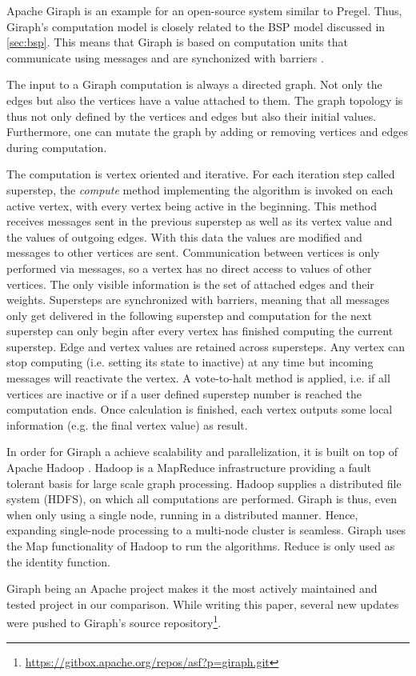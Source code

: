 Apache Giraph is an example for an open-source system similar to Pregel.
Thus, Giraph's computation model is closely related to the BSP model discussed in \autoref{sec:bsp}. 
This means that Giraph is based on computation units that communicate using messages and are synchonized with barriers \cite{Giraph}.

The input to a Giraph computation is always a directed graph. Not only the edges but also the vertices have a value attached to them. The graph topology is thus not only defined by the vertices and edges but also their initial values.
Furthermore, one can mutate the graph by adding or removing vertices and edges during computation.

The computation is vertex oriented and iterative.
For each iteration step called superstep, the \emph{compute} method implementing the algorithm is invoked on each active vertex, with every vertex being active in the beginning.
This method receives messages sent in the previous superstep as well as its vertex value and the values of outgoing edges.
With this data the values are modified and messages to other vertices are sent.
Communication between vertices is only performed via messages, so a vertex has no direct access to values of other vertices. The only visible information is the set of attached edges and their weights.
Supersteps are synchronized with barriers, meaning that all messages only get delivered in the following superstep and computation for the next superstep can only begin after every vertex has finished computing the current superstep.
Edge and vertex values are retained across supersteps.
Any vertex can stop computing (i.e. setting its state to inactive) at any time but incoming messages will reactivate the vertex.
A vote-to-halt method is applied, i.e. if all vertices are inactive or if a user defined superstep number is reached the computation ends.
Once calculation is finished, each vertex outputs some local information (e.g. the final vertex value) as result.

In order for Giraph a achieve scalability and parallelization, it is built on top of Apache Hadoop \cite{Giraph}.
Hadoop is a MapReduce infrastructure providing a fault tolerant basis for large scale graph processing.
Hadoop supplies a distributed file system (HDFS), on which all computations are performed.
Giraph is thus, even when only using a single node, running in a distributed manner.
Hence, expanding single-node processing to a multi-node cluster is seamless.
Giraph uses the Map functionality of Hadoop to run the algorithms. Reduce is only used as the identity function.

Giraph being an Apache project makes it the most actively maintained and tested project in our comparison. While writing this paper, several new updates were pushed to Giraph's source repository\footnote{\url{https://gitbox.apache.org/repos/asf?p=giraph.git}}.
